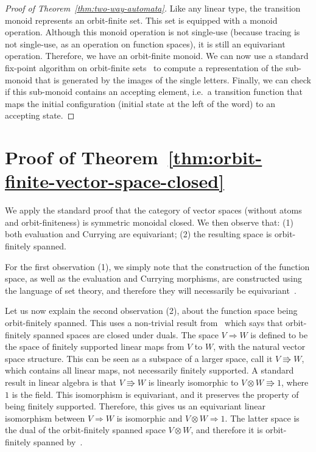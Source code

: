 \documentclass[10pt,a4paper]{amsart}
\numberwithin{equation}{section}
\theoremstyle{plain}
\newcommand{\funspace}[2]{#1 \Rightarrow #2}
\newcommand{\funspacenonfs}[2]{#1 \Rrightarrow  #2}
\begin{document}
\begin{proof}[Proof of Theorem~\ref{thm:two-way-automata}]
        Like any linear type, the transition monoid represents an orbit-finite set. This set is equipped with a monoid operation. Although this monoid operation is not single-use (because tracing is not single-use, as an operation on function spaces), it is still an equivariant operation. Therefore, we have an orbit-finite monoid. We can now use a standard fix-point algorithm on orbit-finite sets~\cite{bojanczyk_slightly2018} to compute a representation of the sub-monoid that is generated by the images of the single letters. Finally, we can check if this sub-monoid contains an accepting element, i.e.~a transition function that maps the initial configuration (initial state at the left of the word) to an accepting state. 
\end{proof}

\section{Proof of Theorem~\ref{thm:orbit-finite-vector-space-closed}}
 We apply the standard proof that the category of vector spaces (without atoms and orbit-finiteness) is symmetric monoidal closed. We then observe that: (1) both evaluation and Currying are equivariant; (2) the resulting space is orbit-finitely spanned. 
    
    For the first observation (1), we simply note that the construction of the function space, as well as  the evaluation and Currying morphisms, are constructed using the language of set theory, and therefore they will necessarily be equivariant~\cite[Equivariance Principle]{bojanczyk_slightly2018}.

    Let us now explain the second observation (2), about the function space being orbit-finitely spanned. This uses a non-trivial result from~\cite{bojanczykKM21OrbitFiniteVector} which says that orbit-finitely spanned spaces are closed under duals. 
    The space $\funspace V W$ is defined to be the space of finitely supported linear maps from $V$ to $W$, with the natural vector space structure. This can be seen as a subspace of a larger space, call it $\funspacenonfs V W$, which contains all linear maps, not necessarily finitely supported. A standard result in linear algebra is that $\funspacenonfs V W$ is linearly isomorphic to $ \funspacenonfs {V \otimes W} 1$, where $1$ is the field. This isomorphism is equivariant, and it preserves the property of being finitely supported. Therefore, this gives us an equivariant linear isomorphism between $\funspace V W$ is isomorphic and $ \funspace {V \otimes W} 1$. The latter space is the dual of the orbit-finitely spanned space $V \otimes W$, and therefore it is orbit-finitely spanned by~\cite[Corollary VI.5]{bojanczykKM21OrbitFiniteVector}.
\end{document}
